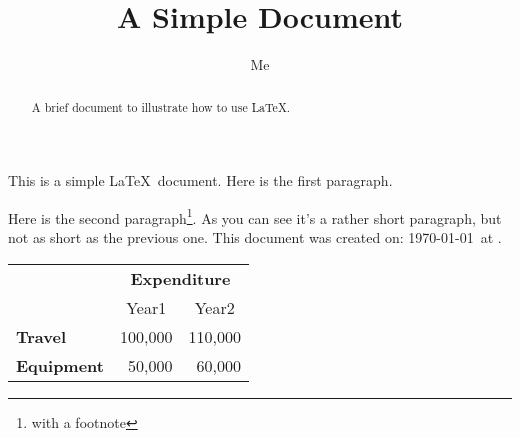 \documentclass[12pt]{scrartcl}
\title{A Simple Document}
\author{Me}
\begin{document}
\maketitle

\begin{abstract}
A brief document to illustrate how to use \LaTeX.
\end{abstract}

This is a simple \LaTeX\ document.
Here is the first paragraph.

Here is the second paragraph\footnote{with a footnote}. 
As you can see it's a rather short paragraph, but not 
as short as the previous one. This document was 
created on: \today\ at \currenttime.

\begin{tabular}{lrr}
 & \multicolumn{2}{c}{\bfseries Expenditure}\\
 & \multicolumn{1}{c}{Year1} & \multicolumn{1}{c}{Year2}\\
\bfseries Travel & 100,000 & 110,000\\
\bfseries Equipment & 50,000 & 60,000
\end{tabular}
\end{document}
